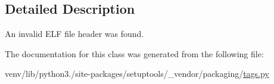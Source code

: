 \subsection{Detailed Description}
\begin{DoxyVerb}An invalid ELF file header was found.
\end{DoxyVerb}
 

The documentation for this class was generated from the following file\+:\begin{DoxyCompactItemize}
\item 
venv/lib/python3./site-\/packages/setuptools/\+\_\+vendor/packaging/\hyperlink{setuptools_2__vendor_2packaging_2tags_8py}{tags.\+py}\end{DoxyCompactItemize}
